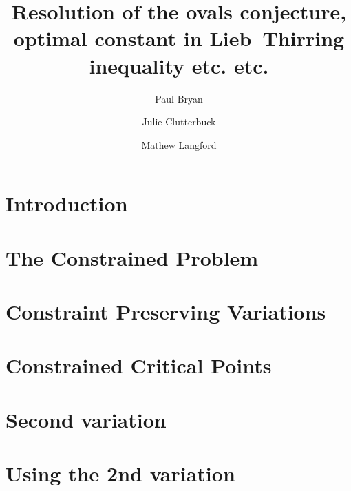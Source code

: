 \documentclass[12pt, a4paper]{amsart}
\begin{document}
  




\title[The ovals problem]{Resolution of the ovals conjecture, optimal constant in Lieb--Thirring inequality etc. etc.}



{\author{Paul Bryan}
\address[Paul Bryan]{Macquarie}}


{\author{Julie Clutterbuck} 
\address[Julie Clutterbuck]{School of Mathematical Sciences, 
  Monash University,  VIC 3800  Australia}
}

{\author{Mathew Langford}
\address[Mat Langford]{Tennessee}}



\maketitle



\section{Introduction}





\section{The Constrained Problem}



\section{Constraint Preserving Variations}



\section{Constrained Critical Points}


\section{Second variation}


\section{Using the 2nd variation}



  
 



 
\end{document}
